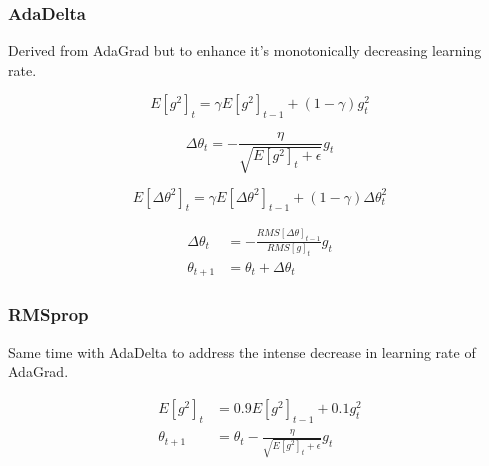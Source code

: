 \documentclass{beamer}
\begin{document}
\begin{frame}
    \frametitle{AdaDelta}
    Derived from AdaGrad but to enhance it's monotonically decreasing learning rate.
    
    \begin{equation}
E\left[g^{2}\right]_{t}=\gamma E\left[g^{2}\right]_{t-1}+(1-\gamma) g_{t}^{2}
\end{equation}

\begin{equation}
\Delta \theta_{t}=-\frac{\eta}{\sqrt{E\left[g^{2}\right]_{t}+\epsilon}} g_{t}
\end{equation}

\begin{equation}
E\left[\Delta \theta^{2}\right]_{t}=\gamma E\left[\Delta \theta^{2}\right]_{t-1}+(1-\gamma) \Delta \theta_{t}^{2}
\end{equation}

\begin{equation}
\begin{aligned} \Delta \theta_{t} &=-\frac{R M S[\Delta \theta]_{t-1}}{R M S[g]_{t}} g_{t} \\ \theta_{t+1} &=\theta_{t}+\Delta \theta_{t} \end{aligned}
\end{equation}
    
\end{frame}


\begin{frame}
    \frametitle{RMSprop}
    

    
    Same time with AdaDelta to address the intense decrease in learning rate of AdaGrad. 
    
    \begin{equation}
\begin{aligned} E\left[g^{2}\right]_{t} &=0.9 E\left[g^{2}\right]_{t-1}+0.1 g_{t}^{2} \\ \theta_{t+1} &=\theta_{t}-\frac{\eta}{\sqrt{E\left[g^{2}\right]_{t}+\epsilon}} g_{t} \end{aligned}
\end{equation}
    
\end{frame}
\end{document}

